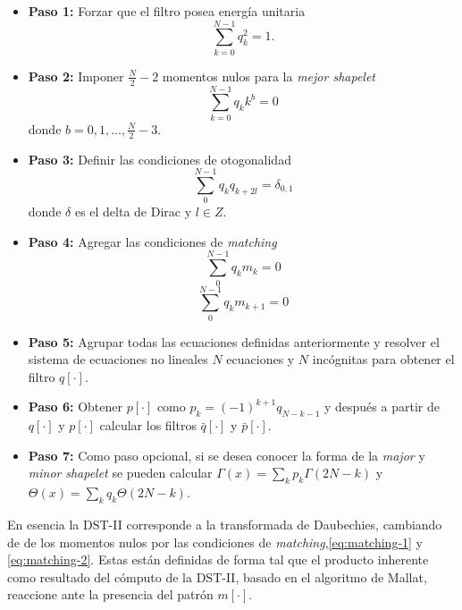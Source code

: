 \begin{itemize}
	\item \textbf{Paso 1:} Forzar que el filtro posea energía unitaria
		\begin{equation}\label{eq:unitary-energy}
			\sum_{k=0}^{N-1}q_k^2 = 1.
		\end{equation}
	\item \textbf{Paso 2:} Imponer $\frac{N}{2} -2 $ momentos nulos para la \textit{mejor shapelet}
		\begin{equation}\label{eq:vanishing-moments}
			\sum_{k=0}^{N-1}q_{k}k^b = 0
		\end{equation}
		donde $b=0,1,\dotsc,\frac{N}{2}-3$.
	\item \textbf{Paso 3:} Definir las condiciones de otogonalidad
		\begin{equation}\label{eq:orthogonality}
			\sum_{0}^{N-1} q_{k}q_{k+2l} = \delta_{0,1}
		\end{equation}
		donde $\delta$ es el delta de Dirac y $l\in Z$.
	\item \textbf{Paso 4:} Agregar las condiciones de \textit{matching}
		\begin{equation}\label{eq:matching-1}
			\sum_{0}^{N-1} q_{k}m_{k} = 0
		\end{equation}
		\begin{equation}\label{eq:matching-2}
			\sum_{0}^{N-1} q_{k}m_{k+1} = 0
		\end{equation}
	\item \textbf{Paso 5:} Agrupar todas las ecuaciones definidas anteriormente y resolver el sistema de ecuaciones
		no lineales $N$ ecuaciones y $N$ incógnitas para obtener el filtro $q[\cdot]$.
	\item \textbf{Paso 6:} Obtener $p[\cdot]$ como $p_k=(-1)^{k+1}q_{N-k-1}$ y 
		después a partir de $q[\cdot]$ y $p[\cdot]$ calcular los filtros $\bar q[\cdot]$ y $\bar p[\cdot]$.
	\item \textbf{Paso 7:} Como paso opcional, si se desea conocer la forma de la \textit{major} y \textit{minor}
		\textit{shapelet} se pueden calcular $\Gamma(x)=\sum_k p_k \Gamma(2N-k)$ y $\Theta(x)=\sum_k q_k \Theta(2N-k)$.
\end{itemize}

En esencia la DST-II corresponde a la transformada de Daubechies, cambiando de de los momentos nulos por las
condiciones de \textit{matching},\ref{eq:matching-1} y \ref{eq:matching-2}. Estas están definidas de forma tal que el
producto inherente como resultado del cómputo de la DST-II, basado en el algoritmo de Mallat, reaccione ante 
la presencia del patrón $m[\cdot]$.

